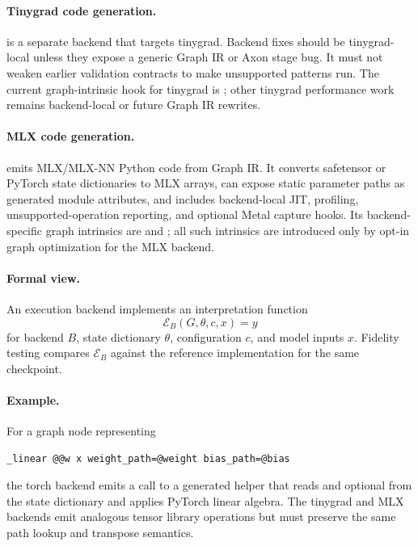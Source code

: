 \paragraph{Tinygrad code generation.}
 is a separate backend that targets tinygrad.  Backend
fixes should be tinygrad-local unless they expose a generic Graph IR or Axon
stage bug.  It must not weaken earlier validation contracts to make unsupported
patterns run.  The current graph-intrinsic hook for tinygrad is
; other tinygrad performance work remains backend-local
or future Graph IR rewrites.

\paragraph{MLX code generation.}
 emits MLX/MLX-NN Python code from Graph IR.  It converts
safetensor or PyTorch state dictionaries to MLX arrays, can expose static
parameter paths as generated module attributes, and includes backend-local JIT,
profiling, unsupported-operation reporting, and optional Metal capture hooks.
Its backend-specific graph intrinsics are  and
; all such intrinsics are introduced only by opt-in graph
optimization for the MLX backend.

\paragraph{Formal view.}
An execution backend implements an interpretation function
\[
  \mathcal{E}_B(G,\theta,c,x) = y
\]
for backend \(B\), state dictionary \(\theta\), configuration \(c\), and model
inputs \(x\).  Fidelity testing compares \(\mathcal{E}_B\) against
the reference implementation for the same checkpoint.

\paragraph{Example.}
For a graph node representing
\begin{verbatim}
_linear @@w x weight_path=@weight bias_path=@bias
\end{verbatim}
the torch backend emits a call to a generated helper that reads
 and optional  from the state dictionary and applies
PyTorch linear algebra.  The tinygrad and MLX backends emit analogous tensor
library operations but must preserve the same path lookup and transpose
semantics.
